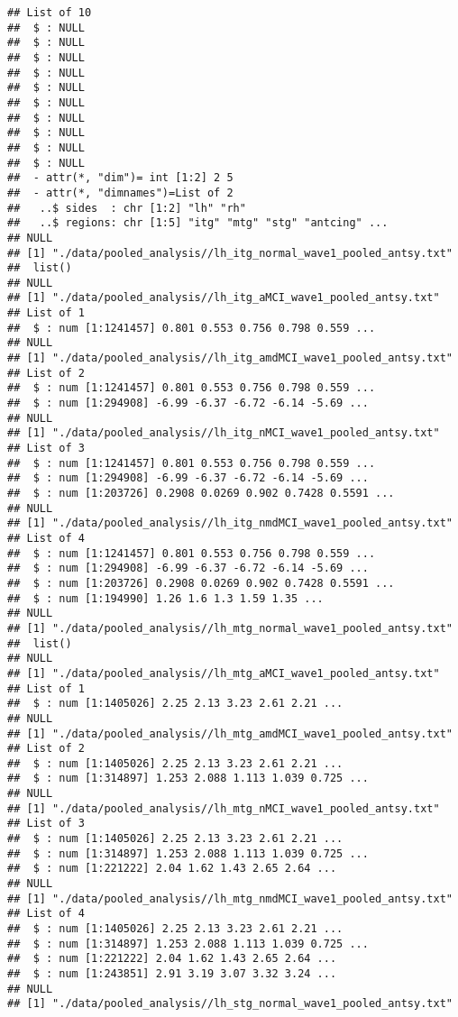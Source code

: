 \documentclass[12pt]{article}\usepackage[]{graphicx}\usepackage[]{color}
\makeatletter
\newenvironment{kframe}{%
 \def\at@end@of@kframe{}%
 \ifinner\ifhmode%
  \def\at@end@of@kframe{\end{minipage}}%
  \begin{minipage}{\columnwidth}%
 \fi\fi%
 \def\FrameCommand##1{\hskip\@totalleftmargin \hskip-\fboxsep
 \colorbox{shadecolor}{##1}\hskip-\fboxsep
     \hskip-\linewidth \hskip-\@totalleftmargin \hskip\columnwidth}%
 \MakeFramed {\advance\hsize-\width
   \@totalleftmargin\z@ \linewidth\hsize
   \@setminipage}}%
 {\par\unskip\endMakeFramed%
 \at@end@of@kframe}
\newenvironment{knitrout}{}{} %
\makeatother
\begin{document}
\begin{knitrout}
\color{fgcolor}\begin{kframe}
\begin{verbatim}
## List of 10
##  $ : NULL
##  $ : NULL
##  $ : NULL
##  $ : NULL
##  $ : NULL
##  $ : NULL
##  $ : NULL
##  $ : NULL
##  $ : NULL
##  $ : NULL
##  - attr(*, "dim")= int [1:2] 2 5
##  - attr(*, "dimnames")=List of 2
##   ..$ sides  : chr [1:2] "lh" "rh"
##   ..$ regions: chr [1:5] "itg" "mtg" "stg" "antcing" ...
## NULL
## [1] "./data/pooled_analysis//lh_itg_normal_wave1_pooled_antsy.txt"
##  list()
## NULL
## [1] "./data/pooled_analysis//lh_itg_aMCI_wave1_pooled_antsy.txt"
## List of 1
##  $ : num [1:1241457] 0.801 0.553 0.756 0.798 0.559 ...
## NULL
## [1] "./data/pooled_analysis//lh_itg_amdMCI_wave1_pooled_antsy.txt"
## List of 2
##  $ : num [1:1241457] 0.801 0.553 0.756 0.798 0.559 ...
##  $ : num [1:294908] -6.99 -6.37 -6.72 -6.14 -5.69 ...
## NULL
## [1] "./data/pooled_analysis//lh_itg_nMCI_wave1_pooled_antsy.txt"
## List of 3
##  $ : num [1:1241457] 0.801 0.553 0.756 0.798 0.559 ...
##  $ : num [1:294908] -6.99 -6.37 -6.72 -6.14 -5.69 ...
##  $ : num [1:203726] 0.2908 0.0269 0.902 0.7428 0.5591 ...
## NULL
## [1] "./data/pooled_analysis//lh_itg_nmdMCI_wave1_pooled_antsy.txt"
## List of 4
##  $ : num [1:1241457] 0.801 0.553 0.756 0.798 0.559 ...
##  $ : num [1:294908] -6.99 -6.37 -6.72 -6.14 -5.69 ...
##  $ : num [1:203726] 0.2908 0.0269 0.902 0.7428 0.5591 ...
##  $ : num [1:194990] 1.26 1.6 1.3 1.59 1.35 ...
## NULL
## [1] "./data/pooled_analysis//lh_mtg_normal_wave1_pooled_antsy.txt"
##  list()
## NULL
## [1] "./data/pooled_analysis//lh_mtg_aMCI_wave1_pooled_antsy.txt"
## List of 1
##  $ : num [1:1405026] 2.25 2.13 3.23 2.61 2.21 ...
## NULL
## [1] "./data/pooled_analysis//lh_mtg_amdMCI_wave1_pooled_antsy.txt"
## List of 2
##  $ : num [1:1405026] 2.25 2.13 3.23 2.61 2.21 ...
##  $ : num [1:314897] 1.253 2.088 1.113 1.039 0.725 ...
## NULL
## [1] "./data/pooled_analysis//lh_mtg_nMCI_wave1_pooled_antsy.txt"
## List of 3
##  $ : num [1:1405026] 2.25 2.13 3.23 2.61 2.21 ...
##  $ : num [1:314897] 1.253 2.088 1.113 1.039 0.725 ...
##  $ : num [1:221222] 2.04 1.62 1.43 2.65 2.64 ...
## NULL
## [1] "./data/pooled_analysis//lh_mtg_nmdMCI_wave1_pooled_antsy.txt"
## List of 4
##  $ : num [1:1405026] 2.25 2.13 3.23 2.61 2.21 ...
##  $ : num [1:314897] 1.253 2.088 1.113 1.039 0.725 ...
##  $ : num [1:221222] 2.04 1.62 1.43 2.65 2.64 ...
##  $ : num [1:243851] 2.91 3.19 3.07 3.32 3.24 ...
## NULL
## [1] "./data/pooled_analysis//lh_stg_normal_wave1_pooled_antsy.txt"

\end{verbatim}
\end{kframe}
\end{knitrout}
\end{document}
